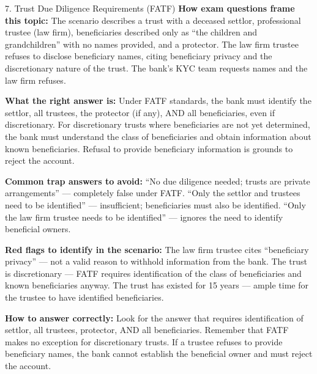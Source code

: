 \documentclass[11pt,a4paper]{beamer}
\begin{document}
	\begin{frame}{7. Trust Due Diligence Requirements (FATF)}
		\tiny
		\noindent\textbf{How exam questions frame this topic:} The scenario describes a trust with a deceased settlor, professional trustee (law firm), beneficiaries described only as “the children and grandchildren” with no names provided, and a protector. The law firm trustee refuses to disclose beneficiary names, citing beneficiary privacy and the discretionary nature of the trust. The bank's KYC team requests names and the law firm refuses.
		
		\vspace{0.1cm}
		\noindent\textbf{What the right answer is:} Under FATF standards, the bank must identify the settlor, all trustees, the protector (if any), AND all beneficiaries, even if discretionary. For discretionary trusts where beneficiaries are not yet determined, the bank must understand the class of beneficiaries and obtain information about known beneficiaries. Refusal to provide beneficiary information is grounds to reject the account.
		
		\vspace{0.1cm}
		\noindent\textbf{Common trap answers to avoid:} “No due diligence needed; trusts are private arrangements” — completely false under FATF. “Only the settlor and trustees need to be identified” — insufficient; beneficiaries must also be identified. “Only the law firm trustee needs to be identified” — ignores the need to identify beneficial owners.
		
		\vspace{0.1cm}
		\noindent\textbf{Red flags to identify in the scenario:} The law firm trustee cites “beneficiary privacy” — not a valid reason to withhold information from the bank. The trust is discretionary — FATF requires identification of the class of beneficiaries and known beneficiaries anyway. The trust has existed for 15 years — ample time for the trustee to have identified beneficiaries.
		
		\vspace{0.1cm}
		\noindent\textbf{How to answer correctly:} Look for the answer that requires identification of settlor, all trustees, protector, AND all beneficiaries. Remember that FATF makes no exception for discretionary trusts. If a trustee refuses to provide beneficiary names, the bank cannot establish the beneficial owner and must reject the account.
	\end{frame}
	
\end{document}
